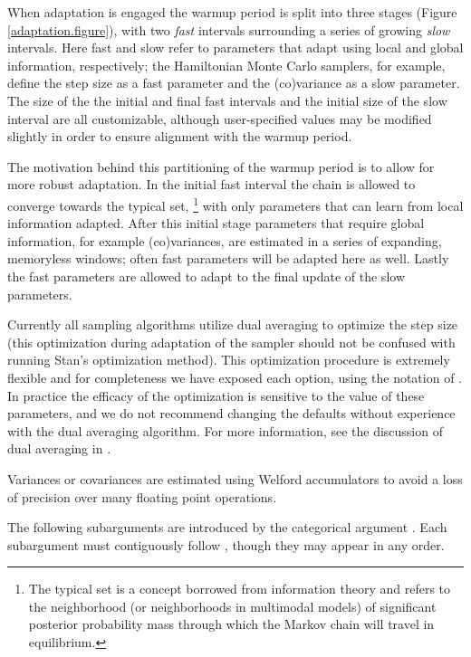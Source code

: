 When adaptation is engaged the warmup period is split into three
stages (Figure \ref{adaptation.figure}), with two \textit{fast} intervals
surrounding a series of growing \textit{slow} intervals.  Here fast
and slow refer to parameters that adapt using local and global
information, respectively; the Hamiltonian Monte Carlo samplers,
for example, define the step size as a fast parameter and 
the (co)variance as a slow parameter.  The size of the the initial
and final fast intervals and the initial size of the slow interval
are all customizable, although user-specified values may be modified 
slightly in order to ensure alignment with the warmup period.

The motivation behind this partitioning of the warmup period is to
allow for more robust adaptation.  In the initial fast interval the
chain is allowed to converge towards the typical set,%
%
\footnote{The typical set is a concept borrowed from information
theory and refers to the neighborhood (or neighborhoods in multimodal models)
of significant posterior probability mass through which the Markov chain
will travel in equilibrium.}
%
with only parameters that can learn from local information adapted.
After this initial stage parameters that require global information,
for example (co)variances, are estimated in a series of expanding,
memoryless windows; often fast parameters will be adapted here
as well.  Lastly the fast parameters are allowed to adapt to the final 
update of the slow parameters.

Currently all \Stan sampling algorithms utilize dual averaging to
optimize the step size (this optimization during adaptation of the
sampler should not be confused with running Stan's optimization method).
This optimization procedure is extremely flexible and for completeness
we have exposed each option, using the notation of
\citep{Hoffman-Gelman:2011, Hoffman-Gelman:2014}.  In practice the
efficacy of the optimization is sensitive to the value of these
parameters, and we do not recommend changing the defaults without
experience with the dual averaging algorithm.  For more information,
see the discussion of dual averaging in \citep{Hoffman-Gelman:2011,
 Hoffman-Gelman:2014}.
  
Variances or covariances are estimated using Welford accumulators
to avoid a loss of precision over many floating point operations.

The following subarguments are introduced by the categorical argument
.  Each subargument must contiguously follow ,
though they may appear in any order.  

